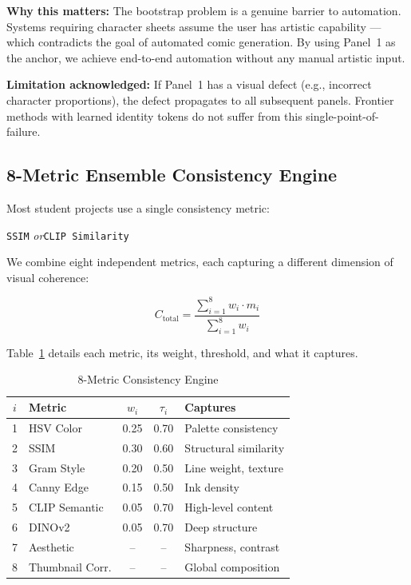 \documentclass[11pt,a4paper,twocolumn]{article}
\begin{document}
\textbf{Why this matters:} The bootstrap problem is a genuine barrier to automation. Systems requiring character sheets assume the user has artistic capability --- which contradicts the goal of automated comic generation. By using Panel~1 as the anchor, we achieve end-to-end automation without any manual artistic input.

\textbf{Limitation acknowledged:} If Panel~1 has a visual defect (e.g., incorrect character proportions), the defect propagates to all subsequent panels. Frontier methods with learned identity tokens do not suffer from this single-point-of-failure.

\subsection{8-Metric Ensemble Consistency Engine}
\label{sec:consistency}

Most student projects use a single consistency metric:

\begin{center}
\texttt{SSIM} \quad\textit{or}\quad \texttt{CLIP Similarity}
\end{center}

\noindent We combine eight independent metrics, each capturing a different dimension of visual coherence:

\begin{equation}
C_{\text{total}} = \frac{\sum_{i=1}^{8} w_i \cdot m_i}{\sum_{i=1}^{8} w_i}
\label{eq:consistency}
\end{equation}

Table~\ref{tab:metrics} details each metric, its weight, threshold, and what it captures.

\begin{table}[H]
\caption{8-Metric Consistency Engine}
\label{tab:metrics}
\centering
\scriptsize
\begin{tabular}{clccl}
\toprule
$i$ & \textbf{Metric} & $w_i$ & $\tau_i$ & \textbf{Captures} \\
\midrule
1 & HSV Color & 0.25 & 0.70 & Palette consistency \\
2 & SSIM & 0.30 & 0.60 & Structural similarity \\
3 & Gram Style & 0.20 & 0.50 & Line weight, texture \\
4 & Canny Edge & 0.15 & 0.50 & Ink density \\
5 & CLIP Semantic & 0.05 & 0.70 & High-level content \\
6 & DINOv2 & 0.05 & 0.70 & Deep structure \\
7 & Aesthetic & -- & -- & Sharpness, contrast \\
8 & Thumbnail Corr. & -- & -- & Global composition \\
\bottomrule
\end{tabular}
\end{table}
\end{document}
